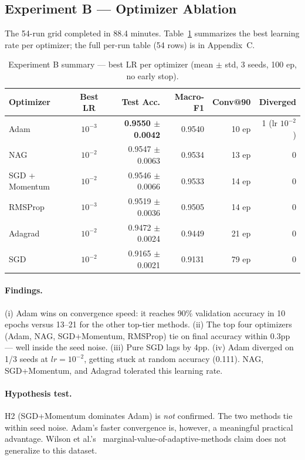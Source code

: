 \documentclass[10pt,letterpaper]{article}
\begin{document}
\subsection{Experiment B --- Optimizer Ablation}
\label{sec:results-expB}
The 54-run grid completed in 88.4 minutes. Table~\ref{tab:expB} summarizes the best learning rate per optimizer; the full per-run table (54 rows) is in Appendix~C.

\begin{table}[h]
\centering
\small
\caption{Experiment B summary --- best LR per optimizer (mean $\pm$ std, 3 seeds, 100 ep, no early stop).}
\label{tab:expB}
\begin{tabular}{lcrrrr}
\toprule
\textbf{Optimizer} & \textbf{Best LR} & \textbf{Test Acc.} & \textbf{Macro-F1} & \textbf{Conv@90} & \textbf{Diverged} \\
\midrule
Adam            & $10^{-3}$ & \textbf{0.9550 $\pm$ 0.0042} & 0.9540 & 10 ep & 1 (lr $10^{-2}$) \\
NAG             & $10^{-2}$ & 0.9547 $\pm$ 0.0063 & 0.9534 & 13 ep & 0 \\
SGD + Momentum  & $10^{-2}$ & 0.9546 $\pm$ 0.0066 & 0.9533 & 14 ep & 0 \\
RMSProp         & $10^{-3}$ & 0.9519 $\pm$ 0.0036 & 0.9505 & 14 ep & 0 \\
Adagrad         & $10^{-2}$ & 0.9472 $\pm$ 0.0024 & 0.9449 & 21 ep & 0 \\
SGD             & $10^{-2}$ & 0.9165 $\pm$ 0.0021 & 0.9131 & 79 ep & 0 \\
\bottomrule
\end{tabular}
\end{table}

\paragraph{Findings.} (i) Adam wins on convergence speed: it reaches 90\% validation accuracy in 10 epochs versus 13--21 for the other top-tier methods. (ii) The top four optimizers (Adam, NAG, SGD+Momentum, RMSProp) tie on final accuracy within 0.3pp --- well inside the seed noise. (iii) Pure SGD lags by 4pp. (iv) Adam diverged on 1/3 seeds at $lr{=}10^{-2}$, getting stuck at random accuracy (0.111). NAG, SGD+Momentum, and Adagrad tolerated this learning rate.

\paragraph{Hypothesis test.} H2 (SGD+Momentum dominates Adam) is \emph{not} confirmed. The two methods tie within seed noise. Adam's faster convergence is, however, a meaningful practical advantage. Wilson et al.'s~\cite{wilson2017} marginal-value-of-adaptive-methods claim does not generalize to this dataset.
\end{document}
